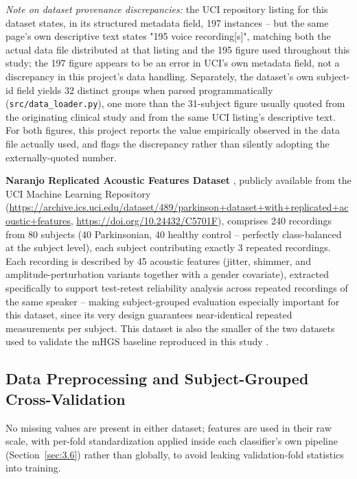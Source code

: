 \emph{Note on dataset provenance discrepancies:} the UCI repository
listing for this dataset states, in its structured metadata field, 197
instances -- but the same page's own descriptive text states "195 voice
recording[s]", matching both the actual data file distributed at that
listing and the 195 figure used throughout this study; the 197 figure
appears to be an error in UCI's own metadata field, not a discrepancy in
this project's data handling. Separately, the dataset's own subject-id
field yields 32 distinct groups when parsed programmatically
(\texttt{src/data\_loader.py}), one more than the 31-subject figure
usually quoted from the originating clinical study and from the same UCI
listing's descriptive text. For both figures, this project reports the
value empirically observed in the data file actually used, and flags the
discrepancy rather than silently adopting the externally-quoted number.

\textbf{Naranjo Replicated Acoustic Features Dataset} \cite{Naranjo:2016},
publicly available from the UCI Machine Learning Repository
(\url{https://archive.ics.uci.edu/dataset/489/parkinson+dataset+with+replicated+acoustic+features},
\url{https://doi.org/10.24432/C5701F}), comprises 240 recordings from 80
subjects (40 Parkinsonian, 40 healthy control -- perfectly class-balanced
at the subject level), each subject
contributing exactly 3 repeated recordings. Each recording is described by
45 acoustic features (jitter, shimmer, and amplitude-perturbation
variants together with a gender covariate), extracted specifically to
support test-retest reliability analysis across repeated recordings of
the same speaker -- making subject-grouped evaluation especially
important for this dataset, since its very design guarantees near-identical
repeated measurements per subject. This dataset is also the smaller of
the two datasets used to validate the mHGS baseline reproduced in this
study \cite{Hashim:2023}.

\subsection{Data Preprocessing and Subject-Grouped Cross-Validation}
\label{sec:3.2}

No missing values are present in either dataset; features are used in
their raw scale, with per-fold standardization applied inside each
classifier's own pipeline (Section~\ref{sec:3.6}) rather than
globally, to avoid leaking validation-fold statistics into training.


